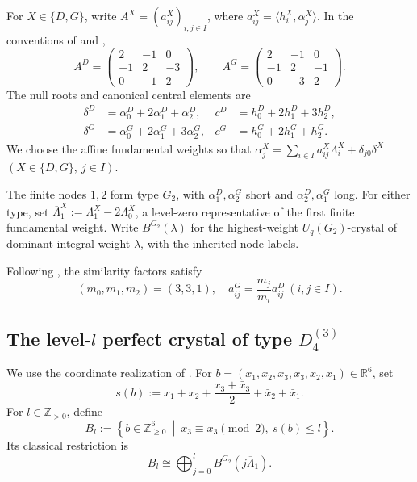 \documentclass[11pt,reqno]{amsart}
\newcommand{\Z}{\mathbb Z}
\newcommand{\Zge}{\mathbb Z_{\ge 0}}
\numberwithin{table}{section}
\numberwithin{equation}{section}
\theoremstyle{plain}
\theoremstyle{definition}
\begin{document}
For \(X\in\{D,G\}\), write
\(A^X=(a_{ij}^X)_{i,j\in I}\), where
\(a_{ij}^X=\langle h_i^X,\alpha_j^X\rangle\).
In the conventions of \cite[Section~2.1]{KMOY} and
\cite[Section~3.1.6]{Yamane},
\begin{equation}\label{eq:Cartan-matrices}
	A^D=
	\begin{pmatrix}
		2&-1&0\\
		-1&2&-3\\
		0&-1&2
	\end{pmatrix},
	\qquad
	A^G=
	\begin{pmatrix}
		2&-1&0\\
		-1&2&-1\\
		0&-3&2
	\end{pmatrix}.
\end{equation}
The null roots and canonical central elements are
\[
\begin{aligned}
	\delta^D
	&=\alpha_0^D+2\alpha_1^D+\alpha_2^D,
	&
	c^D
	&=h_0^D+2h_1^D+3h_2^D,\\
	\delta^G
	&=\alpha_0^G+2\alpha_1^G+3\alpha_2^G,
	&
	c^G
	&=h_0^G+2h_1^G+h_2^G.
\end{aligned}
\]
We choose the affine fundamental weights so that $\alpha_j^X
=
\sum_{i\in I}a_{ij}^X\Lambda_i^X
+\delta_{j0}\delta^X$ $(X\in\{D,G\},\ j\in I)$.

The finite nodes \(1,2\) form type \(G_2\), with
\(\alpha_1^D,\alpha_2^G\) short and
\(\alpha_2^D,\alpha_1^G\) long.
For either type, set $\overline{\Lambda}_1^X
:=
\Lambda_1^X-2\Lambda_0^X$,
a level-zero representative of the first finite fundamental weight.
Write \(B^{G_2}(\lambda)\) for the highest-weight
\(U_q(G_2)\)-crystal of dominant integral weight \(\lambda\),
with the inherited node labels.

Following \cite[Section~1]{MMO}, the similarity factors satisfy
\begin{equation}\label{eq:G-similarity-factors}
	(m_0,m_1,m_2)=(3,3,1),
	\quad
	a_{ij}^G=\frac{m_j}{m_i}a_{ij}^D
	\ (i,j\in I).
\end{equation}

\subsection{\texorpdfstring{The level-$l$ perfect crystal of type
		$D_4^{(3)}$}
	{The level-l perfect crystal of type D4(3)}}

We use the coordinate realization of
\cite[Sections~4.1--4.2]{KMOY}.
For
\(b=(x_1,x_2,x_3,\bar x_3,\bar x_2,\bar x_1)\in\mathbb R^6\),
set
\begin{equation}\label{eq:s-def}
	s(b)
	:=
	x_1+x_2+\frac{x_3+\bar x_3}{2}+\bar x_2+\bar x_1.
\end{equation}
For \(l\in\Z_{>0}\), define
\begin{equation}\label{eq:Bl-set}
	B_l
	:=
	\left\{
	b\in\Zge^6
	\ \middle|\
	x_3\equiv\bar x_3\! \! \!\!\pmod 2,\  s(b)\le l
	\right\}.
\end{equation}
Its classical restriction is
\begin{equation}\label{eq:G2-decomp}
	B_l
	\cong
	\bigoplus_{j=0}^l
	B^{G_2}(j\overline{\Lambda}_1).
\end{equation}
\end{document}
